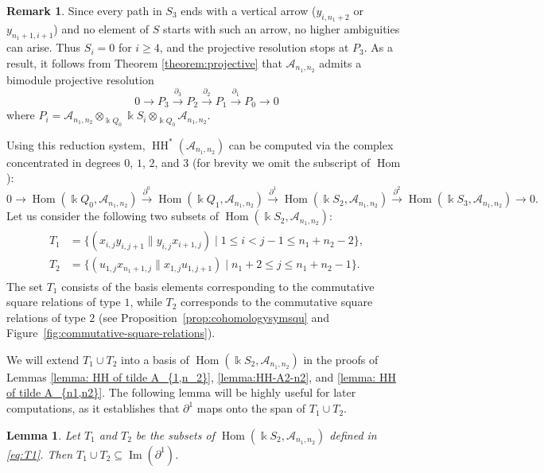 \documentclass[a4paper, reqno, 11pt]{amsart}
\newtheorem{lemma}[theorem]{Lemma}
\theoremstyle{definition}
\newtheorem{remark}[theorem]{Remark}
\begin{document}
\begin{remark}\label{rem:reduction system}
	Since every path in $S_3$ ends with a vertical arrow ($y_{i,n_1+2}$ or $y_{n_1+1,i+1}$) 
	and no element of $S$ starts with such an arrow, no higher ambiguities can arise. Thus \(S_i=0\) for \(i\ge4\), and the projective resolution stops at \(P_3\). As a result, it follows from Theorem \ref{theorem:projective} that $\mathcal A_{n_1,n_2}$ admits a bimodule projective resolution 
	\[
	0\to P_3 \xrightarrow{\partial_3} P_2 \xrightarrow{\partial_2} P_1 \xrightarrow{\partial_1} P_0 \to 0
	\]
	where $P_i = \mathcal A_{n_1,n_2} \otimes_{\Bbbk Q_0} \Bbbk S_i \otimes_{\Bbbk Q_0} \mathcal A_{n_1,n_2}$.
\end{remark}
Using this reduction system, $\operatorname{HH}^*(\mathcal{A}_{n_1,n_2})$ can be computed via the complex concentrated in degrees $0$, $1$, $2$, and $3$ (for brevity we omit the subscript of $\operatorname{Hom}$):
\[
0 \to \operatorname{Hom}(\Bbbk Q_0, \mathcal{A}_{n_1,n_2}) \xrightarrow{\partial^0} 
\operatorname{Hom}(\Bbbk Q_1, \mathcal{A}_{n_1,n_2}) \xrightarrow{\partial^1} 
\operatorname{Hom}(\Bbbk S_2, \mathcal{A}_{n_1,n_2}) \xrightarrow{\partial^2} 
\operatorname{Hom}(\Bbbk S_3, \mathcal{A}_{n_1,n_2}) \to 0.
\]
Let us consider the following two subsets of $\operatorname{Hom}(\Bbbk S_2, \mathcal{A}_{n_1,n_2}) $:
\begin{align}
	\begin{aligned}
		T_1 &= \{(x_{i,j}y_{i,j+1} \parallel y_{i,j}x_{i+1,j}) \mid 1 \le i<j-1 \le n_1+n_2-2\}, \label{eq:T1}\\
		T_2 &= \{(u_{1,j}x_{n_1+1,j} \parallel x_{1,j}u_{1,j+1}) \mid n_1+2 \le j \le n_1+n_2-1\}. 
	\end{aligned}
\end{align}
The set $T_1$ consists of the basis elements corresponding to the commutative square relations of type $1$, while $T_2$ corresponds to the commutative square relations of type $2$ (see Proposition~\ref{prop:cohomologysymsqu} and Figure~\ref{fig:commutative-square-relations}). 

We will extend $T_1 \cup T_2$ into a basis of $\operatorname{Hom}(\Bbbk S_2, \mathcal{A}_{n_1,n_2})$ in the proofs of Lemmas \ref{lemma: HH of tilde A_{1,n_2}}, \ref{lemma:HH-A2-n2}, and \ref{lemma: HH of tilde A_{n1,n2}}. The following lemma will be highly useful for later computations, as it establishes that $\partial^1$ maps onto the span of $T_1\cup T_2$.

\begin{lemma}\label{lemma:T1T2_in_image}
	Let $T_1$ and $T_2$ be the subsets of $\operatorname{Hom}(\Bbbk S_2, \mathcal{A}_{n_1,n_2})$ defined in \eqref{eq:T1}. Then $T_1\cup T_2 \subseteq \operatorname{Im}(\partial^1)$.
\end{lemma}
\end{document}
